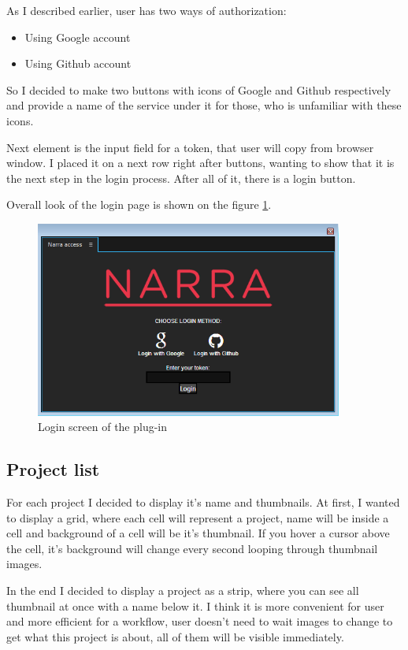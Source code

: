 \documentclass[thesis=B,english]{FITthesis}[2012/10/20]
\begin{document}
As I described earlier, user has two ways of authorization: 
	\begin{itemize}
		\item Using Google account
		\item Using Github account
	\end{itemize}
So I decided to make two buttons with icons of Google and Github respectively and provide a name of the service under it for those, who is unfamiliar with these icons.

Next element is the input field for a token, that user will copy from browser window. I placed it on a next row right after buttons, wanting to show that it is the next step in the login process. After all of it, there is a login button.

Overall look of the login page is shown on the figure \ref{fig:login}.
	\begin{figure}
		\centering
		\includegraphics[width=0.9\textwidth]{LoginPage.png}
		\caption{Login screen of the plug-in}\label{fig:login}
	\end{figure}
\subsection{Project list}
For each project I decided to display it's name and thumbnails. At first, I wanted to display a grid, where each cell will represent a project, name will be inside a cell and background of a cell will be it's thumbnail. If you hover a cursor above the cell, it's background will change every second looping through thumbnail images.

In the end I decided to display a project as a strip, where you can see all thumbnail at once with a name below it. I think it is more convenient for user and more efficient for a workflow, user doesn't need to wait images to change to get what this project is about, all of them will be visible immediately.
\end{document}
